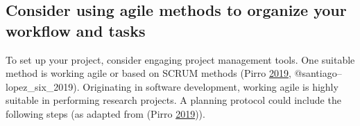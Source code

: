 \documentclass[
]{book}
\begin{document}
\hypertarget{consider-using-agile-methods-to-organize-your-workflow-and-tasks}{%
\subsection{Consider using agile methods to organize your workflow and
tasks}\label{consider-using-agile-methods-to-organize-your-workflow-and-tasks}}

To set up your project, consider engaging project management tools. One
suitable method is working agile or based on SCRUM methods (Pirro
\protect\hyperlink{ref-pirro_how_2019}{2019},
@santiago--lopez\_six\_2019). Originating in software development,
working agile is highly suitable in performing research projects. A
planning protocol could include the following steps (as adapted from
(Pirro \protect\hyperlink{ref-pirro_how_2019}{2019})).
\end{document}
